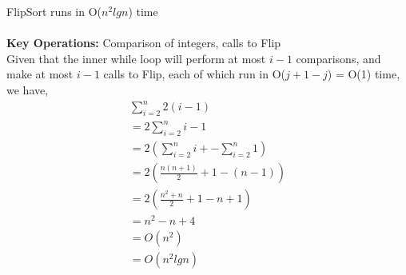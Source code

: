 \documentclass[12pt]{article}
\newenvironment{lemma}[2][Lemma]{\begin{trivlist}
\item[\hskip \labelsep {\bfseries #1}\hskip \labelsep {\bfseries #2.}]}{\end{trivlist}}
\newenvironment{question}[2][Question]{\begin{trivlist}
\item[\hskip \labelsep {\bfseries #1}\hskip \labelsep {\bfseries #2.}]}{\end{trivlist}}
\begin{document}
\begin{question}{1 (b)}
  \begin{lemma}{1.5} FlipSort runs in O($n^{2}lgn$) time \\ \\
    \textbf{Key Operations:} Comparison of integers, calls to Flip \\
    Given that the inner while loop will perform at most $i - 1$ comparisons,
    and make at most $i - 1$ calls to Flip, each of which run in O($j + 1 - j$) = O(1) time,
    we have,
    \begin{align*}
      & \sum_{i=2}^{n} 2(i-1) &\\
      & = 2\sum_{i=2}^{n}i-1 &\\
      & = 2(\sum_{i=2}^{n}i + - \sum_{i=2}^{n}1) &\\
      & = 2(\frac{n(n + 1)}{2} + 1 - (n - 1))&\\
      & = 2(\frac{n^{2} + n}{2} + 1 - n  + 1)&\\
      & = n^{2} - n + 4 & \\
      & = O(n^{2}) & \\
      & = O(n^{2}lgn) &
    \end{align*}
  \end{lemma}
\end{question}
\end{document}
